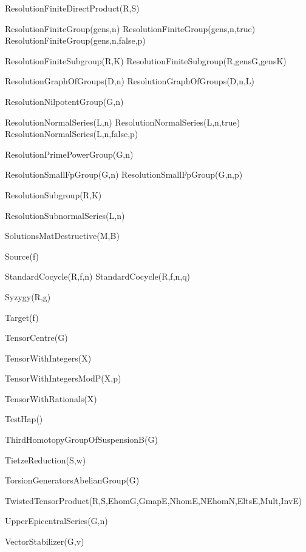 \>ResolutionFiniteDirectProduct(R,S)

\>ResolutionFiniteGroup(gens,n)
\>ResolutionFiniteGroup(gens,n,true)
\>ResolutionFiniteGroup(gens,n,false,p)

\>ResolutionFiniteSubgroup(R,K)
\>ResolutionFiniteSubgroup(R,gensG,gensK)

\>ResolutionGraphOfGroups(D,n)
\>ResolutionGraphOfGroups(D,n,L)

\>ResolutionNilpotentGroup(G,n)

\>ResolutionNormalSeries(L,n)
\>ResolutionNormalSeries(L,n,true)
\>ResolutionNormalSeries(L,n,false,p)

\>ResolutionPrimePowerGroup(G,n)

\>ResolutionSmallFpGroup(G,n)
\>ResolutionSmallFpGroup(G,n,p)

\>ResolutionSubgroup(R,K)

\>ResolutionSubnormalSeries(L,n)

\>SolutionsMatDestructive(M,B)

\>Source(f)

\>StandardCocycle(R,f,n)
\>StandardCocycle(R,f,n,q)

\>Syzygy(R,g)

\>Target(f)

\>TensorCentre(G)

\>TensorWithIntegers(X)

\>TensorWithIntegersModP(X,p)

\>TensorWithRationals(X)

\>TestHap()

\>ThirdHomotopyGroupOfSuspensionB(G)

\>TietzeReduction(S,w)

\>TorsionGeneratorsAbelianGroup(G)

\>TwistedTensorProduct(R,S,EhomG,GmapE,NhomE,NEhomN,EltsE,Mult,InvE)

\>UpperEpicentralSeries(G,n)

\>VectorStabilizer(G,v)


